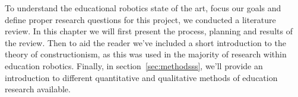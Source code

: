 To understand the educational robotics state of the art, focus our goals and define proper research questions for this project, we conducted a literature review. 
In this chapter we will first present the process, planning and results of the review. Then to aid the reader we've included a short introduction to the theory of constructionism, as this was used in the majority of research within education robotics. 
Finally, in section~\ref{sec:methodsss}, we'll provide an introduction to different quantitative and qualitative methods of education research available. 

	
